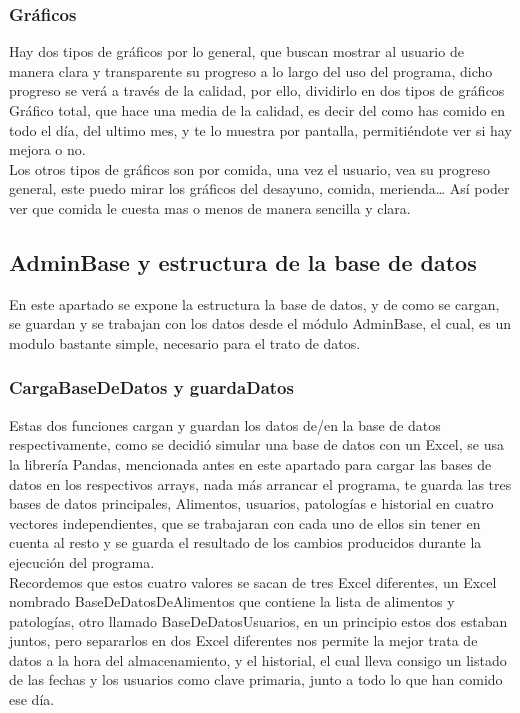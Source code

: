 \subsubsection{Gráficos}
Hay dos tipos de gráficos por lo general, que buscan mostrar al usuario de manera clara y transparente su progreso a lo largo del uso del programa, dicho progreso se verá a través de la calidad, por ello, dividirlo en dos tipos de gráficos
Gráfico total, que hace una media de la calidad, es decir del como has comido en todo el día, del ultimo mes, y te lo muestra por pantalla, permitiéndote ver si hay mejora o no.\\

Los otros tipos de gráficos son por comida, una vez el usuario, vea su progreso general, este puedo mirar los gráficos del desayuno, comida, merienda… Así poder ver que comida le cuesta mas o menos de manera sencilla y clara.\\

\subsection{AdminBase y estructura de la base de datos}
En este apartado se expone la estructura la base de datos, y de como se cargan, se guardan y se trabajan con los datos desde el módulo AdminBase, el cual, es un modulo bastante simple, necesario para el trato de datos.
\subsubsection{CargaBaseDeDatos y guardaDatos}
Estas dos funciones cargan y guardan los datos de/en la base de datos respectivamente, como se decidió simular una base de datos con un Excel, se usa la librería Pandas, mencionada antes en este apartado para cargar las bases de datos en los respectivos arrays, nada más arrancar el programa, te guarda las tres bases de datos principales, Alimentos, usuarios, patologías e historial en cuatro vectores independientes, que se trabajaran con cada uno de ellos sin tener en cuenta al resto y se guarda el resultado de los cambios producidos durante la ejecución del programa. \\

Recordemos que estos cuatro valores se sacan de tres Excel diferentes, un Excel nombrado BaseDeDatosDeAlimentos que contiene la lista de alimentos y patologías, otro llamado BaseDeDatosUsuarios, en un principio estos dos estaban juntos, pero separarlos en dos Excel diferentes nos permite la mejor trata de datos a la hora del almacenamiento, y el historial, el cual lleva consigo un listado de las fechas y los usuarios como clave primaria, junto a todo lo que han comido ese día.\\
